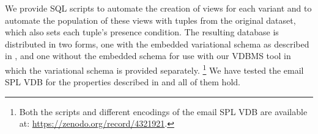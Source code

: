 We provide SQL scripts to automate the creation of views for each
variant%
%
and to automate the population of these views with tuples from the original
dataset,%
which also sets each tuple's presence condition.
%
%
The resulting database is distributed in two forms, one with the embedded
variational schema as described in ,%
%
%
and one without the embedded schema%
%
for use with our VDBMS tool in which the variational schema is provided
separately.%
\footnote{Both the scripts and different encodings of the email SPL VDB are
available at: \url{https://zenodo.org/record/4321921}.} 
%
We have tested the email SPL VDB for the properties described in  
and all of them hold.

%
%
%
%

